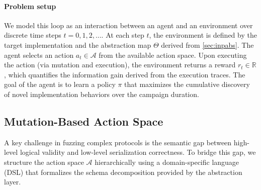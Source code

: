 \paragraph{Problem setup}
We model this loop as an interaction between an agent and an environment over discrete time steps $t=0, 1, 2, \dots$. At each step $t$, the environment is defined by the target implementation and the abstraction map $\Theta$ derived from \autoref{sec:inpabs}. The agent selects an action $a_t \in \mathcal{A}$ from the available action space. Upon executing the action (via mutation and execution), the environment returns a reward $r_t \in \mathbb{R}$, which quantifies the information gain derived from the execution traces. The goal of the agent is to learn a policy $\pi$ that maximizes the cumulative discovery of novel implementation behaviors over the campaign duration.

\subsection{Mutation-Based Action Space}
\label{sec:process_model}

A key challenge in fuzzing complex protocols is the semantic gap between high-level logical validity and low-level serialization correctness. To bridge this gap, we structure the action space $\mathcal{A}$ hierarchically using a domain-specific language (DSL) that formalizes the schema decomposition provided by the abstraction layer.

